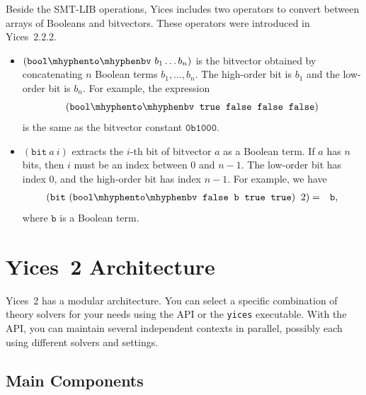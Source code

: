 \documentclass[11pt,twoside,fleqn,openright,titlepage]{cslreport}
\begin{document}
\medskip\noindent Beside the SMT-LIB operations, Yices includes two
operators to convert between arrays of Booleans and bitvectors. These
operators were introduced in Yices~2.2.2.
\begin{itemize}
\item $(\mathtt{bool\mhyphen to\mhyphen bv}\ b_1 \ldots b_n)$ is the
  bitvector obtained by concatenating $n$ Boolean terms
  $b_1,\ldots,b_n$. The high-order bit is $b_1$ and the low-order bit
  is $b_n$.  For example, the expression
$$(\mathtt{bool\mhyphen to\mhyphen bv}\ \:\mathtt{true}\ \:\mathtt{false}\ \:\mathtt{false}\ \:\mathtt{false})$$
is the same as the bitvector constant $\mathtt{0b1000}$.
\item $(\mathtt{bit}\ a\ i)$ extracts the $i$-th bit of bitvector $a$
  as a Boolean term. If $a$ has $n$ bits, then $i$ must be an index
  between $0$ and $n-1$. The low-order bit has index 0, and the high-order bit has index $n-1$.
For example, we have
\begin{eqnarray*}
(\mathtt{bit}\ (\mathtt{bool\mhyphen to\mhyphen bv}\ \:\mathtt{false}\ \:\mathtt{b}\ \:\mathtt{true}\ \:\mathtt{true})\ \:2) & = & \mathtt{b},
\end{eqnarray*}
where $\mathtt{b}$ is a Boolean term.
\begin{small}
\end{small}
\end{itemize}




\chapter{Yices~2 Architecture}
\label{architecture-chapter}

Yices~2 has a modular architecture.  You can select a specific
combination of theory solvers for your needs using the API or the
\texttt{yices} executable.  With the API, you can maintain several
independent contexts in parallel, possibly each using different
solvers and settings.

\section{Main Components}
\end{document}

